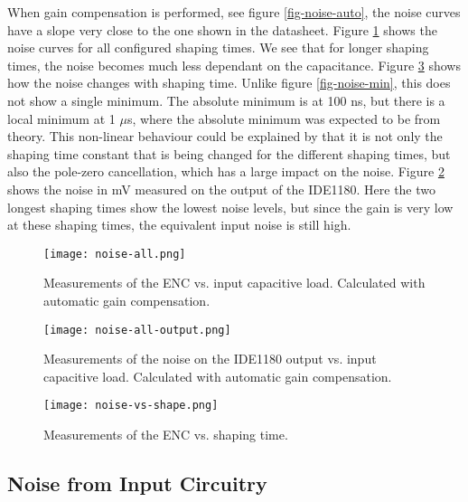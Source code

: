 \documentclass[../main/thesis.tex]{subfiles}
\begin{document}
When gain compensation is performed, see figure \ref{fig-noise-auto}, the noise curves have a slope very close to the one shown in the datasheet. Figure \ref{fig-noise-all} shows the noise curves for all configured shaping times. We see that for longer shaping times, the noise becomes much less dependant on the capacitance. Figure \ref{fig-noise-shape} shows how the noise changes with shaping time. Unlike figure \ref{fig-noise-min}, this does not show a single minimum. The absolute minimum is at 100 ns, but there is a local minimum at 1 $\mu$s, where the absolute minimum was expected to be from theory. This non-linear behaviour could be explained by that it is not only the shaping time constant that is being changed for the different shaping times, but also the pole-zero cancellation, which has a large impact on the noise. Figure \ref{fig-noise-all-output} shows the noise in mV measured on the output of the IDE1180. Here the two longest shaping times show the lowest noise levels, but since the gain is very low at these shaping times, the equivalent input noise is still high. 

\begin{figure}[p] %
	\centering
	\texttt{[image: noise-all.png]}
	\caption{Measurements of the \gls{ENC} vs. input capacitive load. Calculated with automatic gain compensation.}
	\label{fig-noise-all}
\end{figure} 

\begin{figure}[p] %
	\centering
	\texttt{[image: noise-all-output.png]}
	\caption{Measurements of the noise on the IDE1180 output vs. input capacitive load. Calculated with automatic gain compensation.}
	\label{fig-noise-all-output}
\end{figure} 

\begin{figure}[h] %
	\centering
	\texttt{[image: noise-vs-shape.png]}
	\caption{Measurements of the \gls{ENC} vs. shaping time.}
	\label{fig-noise-shape}
\end{figure} 

\newpage
\subsection{Noise from Input Circuitry}
\label{ide-noise-input}
\end{document}
